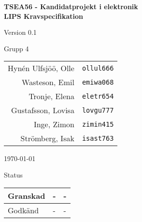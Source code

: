 \documentclass[11pt]{article}
\begin{document}
\begin{titlepage}
\begin{center}

{\Large\bfseries TSEA56 - Kandidatprojekt i elektronik \\ LIPS Kravspecifikation}

\vspace{5em}

Version 0.1

\vspace{5em}
%
Grupp 4 \\
\begin{tabular}{rl}
Hynén Ulfsjöö, Olle&\verb+ollul666+
\\
Wasteson, Emil&\verb+emiwa068+
\\
Tronje, Elena&\verb+eletr654+
\\
Gustafsson, Lovisa&\verb+lovgu777+
\\
Inge, Zimon&\verb+zimin415+
\\
Strömberg, Isak&\verb+isast763+
\\
\end{tabular}

\vspace{5em}
\today

\vspace{18em}
Status
\begin{longtable}{|l|l|l|} \hline

Granskad & - & - \\ \hline
Godkänd & - & - \\ \hline
 
\end{longtable}

\end{center}
\end{titlepage}
\end{document}
